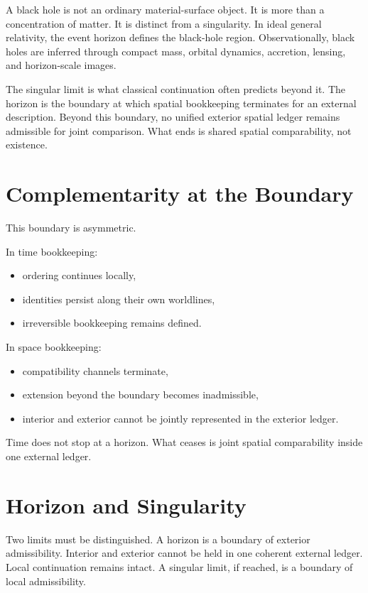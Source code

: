 \documentclass[11pt,twoside,openright]{book}
\begin{document}
A black hole is not an ordinary material-surface object. It is more than a concentration of matter. It is distinct from a singularity. In ideal general relativity, the event horizon defines the black-hole region. Observationally, black holes are inferred through compact mass, orbital dynamics, accretion, lensing, and horizon-scale images.

The singular limit is what classical continuation often predicts beyond it. The horizon is the boundary at which spatial bookkeeping terminates for an external description. Beyond this boundary, no unified exterior spatial ledger remains admissible for joint comparison. What ends is shared spatial comparability, not existence.

\section*{Complementarity at the Boundary}

This boundary is asymmetric.

In time bookkeeping:

\begin{itemize}
\item ordering continues locally,
\item identities persist along their own worldlines,
\item irreversible bookkeeping remains defined.
\end{itemize}

In space bookkeeping:

\begin{itemize}
\item compatibility channels terminate,
\item extension beyond the boundary becomes inadmissible,
\item interior and exterior cannot be jointly represented
      in the exterior ledger.
\end{itemize}

Time does not stop at a horizon. What ceases is joint spatial comparability inside one external ledger.

\section*{Horizon and Singularity}

Two limits must be distinguished. A horizon is a boundary of exterior admissibility. Interior and exterior cannot be held in one coherent external ledger. Local continuation remains intact. A singular limit, if reached, is a boundary of local admissibility.
\end{document}
